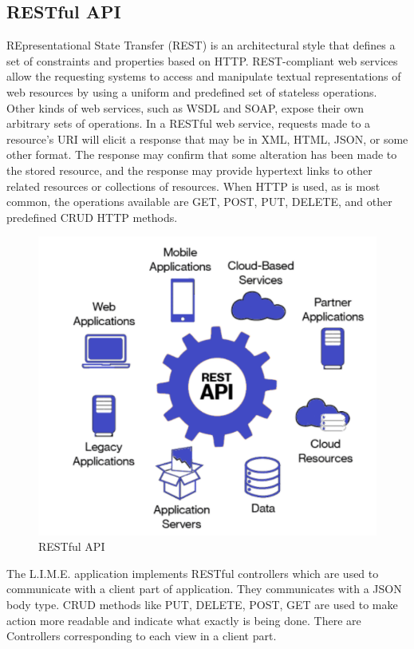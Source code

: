 \documentclass[a4paper,11pt,twoside]{report}
\theoremstyle{definition}
\begin{document}
\subsection{RESTful API}

REpresentational State Transfer (REST) is an architectural style that defines a set of constraints and properties based on HTTP. REST-compliant web services allow the requesting systems to access and manipulate textual representations of web resources by using a uniform and predefined set of stateless operations. Other kinds of web services, such as WSDL and SOAP, expose their own arbitrary sets of operations.
In a RESTful web service, requests made to a resource's URI will elicit a response that may be in XML, HTML, JSON, or some other format. The response may confirm that some alteration has been made to the stored resource, and the response may provide hypertext links to other related resources or collections of resources. When HTTP is used, as is most common, the operations available are GET, POST, PUT, DELETE, and other predefined CRUD HTTP methods. \cite{J}


\begin{figure}[h!]

\begin{center}

\includegraphics{rest}

\end{center}
\caption{RESTful API}
\end{figure}
The L.I.M.E. application implements RESTful controllers which are used to communicate with a client part of application. They communicates with a JSON body type. CRUD methods like PUT, DELETE, POST, GET are used to make action more readable and indicate what exactly is being done. There are Controllers corresponding to each view in a client part. 
\end{document}
